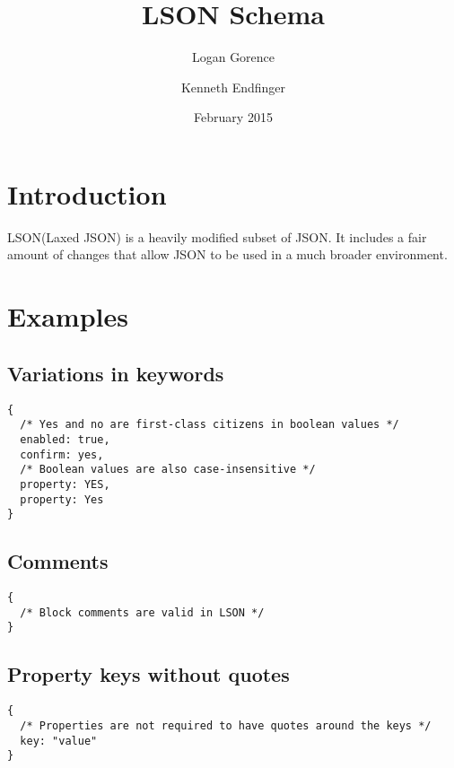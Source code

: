 \documentclass[12pt]{article}
\begin{document}
\title{LSON Schema}
\author{Logan Gorence \and Kenneth Endfinger}
\date{February 2015}
\maketitle
{}
\newpage

\tableofcontents
\newpage

\section{Introduction}
LSON(Laxed JSON) is a heavily modified subset of JSON. It includes a fair amount of changes that allow JSON to be used in a much  broader environment.
\section{Examples}
\subsection{Variations in keywords}
\begin{lstlisting}
{
  /* Yes and no are first-class citizens in boolean values */
  enabled: true,
  confirm: yes,
  /* Boolean values are also case-insensitive */
  property: YES,
  property: Yes
}
\end{lstlisting}
\subsection{Comments}
\begin{lstlisting}
{
  /* Block comments are valid in LSON */
}
\end{lstlisting}
\subsection{Property keys without quotes}
\begin{lstlisting}
{
  /* Properties are not required to have quotes around the keys */
  key: "value"
}
\end{lstlisting}
\end{document}

